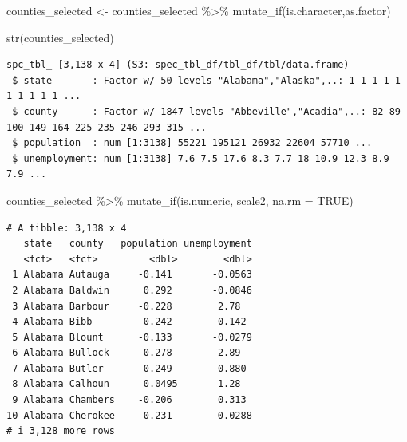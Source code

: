 \documentclass[
  letterpaper,
  DIV=11,
  numbers=noendperiod]{scrreprt}
\newenvironment{Shaded}{\begin{snugshade}}{\end{snugshade}}
\newcommand{\AttributeTok}[1]{\textcolor[rgb]{0.40,0.45,0.13}{#1}}
\newcommand{\ConstantTok}[1]{\textcolor[rgb]{0.56,0.35,0.01}{#1}}
\newcommand{\FunctionTok}[1]{\textcolor[rgb]{0.28,0.35,0.67}{#1}}
\newcommand{\NormalTok}[1]{\textcolor[rgb]{0.00,0.23,0.31}{#1}}
\newcommand{\OtherTok}[1]{\textcolor[rgb]{0.00,0.23,0.31}{#1}}
\newcommand{\SpecialCharTok}[1]{\textcolor[rgb]{0.37,0.37,0.37}{#1}}
\begin{document}
\begin{Shaded}
\begin{Highlighting}[]
\NormalTok{counties\_selected }\OtherTok{\textless{}{-}}\NormalTok{ counties\_selected }\SpecialCharTok{\%\textgreater{}\%} 
  \FunctionTok{mutate\_if}\NormalTok{(is.character,as.factor)}

\FunctionTok{str}\NormalTok{(counties\_selected)}
\end{Highlighting}
\end{Shaded}

\begin{verbatim}
spc_tbl_ [3,138 x 4] (S3: spec_tbl_df/tbl_df/tbl/data.frame)
 $ state       : Factor w/ 50 levels "Alabama","Alaska",..: 1 1 1 1 1 1 1 1 1 1 ...
 $ county      : Factor w/ 1847 levels "Abbeville","Acadia",..: 82 89 100 149 164 225 235 246 293 315 ...
 $ population  : num [1:3138] 55221 195121 26932 22604 57710 ...
 $ unemployment: num [1:3138] 7.6 7.5 17.6 8.3 7.7 18 10.9 12.3 8.9 7.9 ...
\end{verbatim}

\begin{Shaded}
\begin{Highlighting}[]
\NormalTok{counties\_selected }\SpecialCharTok{\%\textgreater{}\%} 
  \FunctionTok{mutate\_if}\NormalTok{(is.numeric, scale2, }\AttributeTok{na.rm =} \ConstantTok{TRUE}\NormalTok{)}
\end{Highlighting}
\end{Shaded}

\begin{verbatim}
# A tibble: 3,138 x 4
   state   county   population unemployment
   <fct>   <fct>         <dbl>        <dbl>
 1 Alabama Autauga     -0.141       -0.0563
 2 Alabama Baldwin      0.292       -0.0846
 3 Alabama Barbour     -0.228        2.78  
 4 Alabama Bibb        -0.242        0.142 
 5 Alabama Blount      -0.133       -0.0279
 6 Alabama Bullock     -0.278        2.89  
 7 Alabama Butler      -0.249        0.880 
 8 Alabama Calhoun      0.0495       1.28  
 9 Alabama Chambers    -0.206        0.313 
10 Alabama Cherokee    -0.231        0.0288
# i 3,128 more rows
\end{verbatim}
\end{document}
